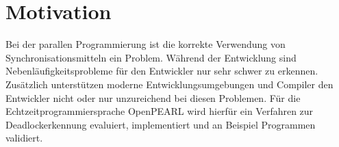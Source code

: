 \section{Motivation}

Bei der parallen Programmierung ist die korrekte Verwendung von
Synchronisationsmitteln ein Problem. Während der Entwicklung sind
Nebenläufigkeitsprobleme für den Entwickler nur sehr schwer zu erkennen.
Zusätzlich unterstützen moderne Entwicklungsumgebungen und Compiler den
Entwickler nicht oder nur unzureichend bei diesen Problemen. Für die
Echtzeitprogrammiersprache OpenPEARL wird hierfür ein Verfahren zur
Deadlockerkennung evaluiert, implementiert und an Beispiel Programmen validiert.